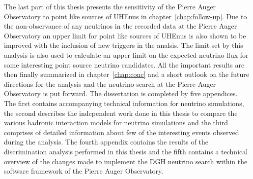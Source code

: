 The last part of this thesis presents the sensitivity of the Pierre Auger Observatory to point like sources of \glspl{UHEnu} in chapter~\ref{chap:follow-up}. Due to the non-observance of any neutrinos in the recorded data at the Pierre Auger Observatory an upper limit for point like sources of \glspl{UHEnu} is also shown to be improved with the inclusion of new triggers in the analsis. The limit set by this analysis is also used to calculate an upper limit on the expected neutrino flux for some interesting point source neutrino candidates. All the important results are then finally summarized in chapter~\ref{chap:conc} and a short outlook on the future directions for the analysis and the neutrino search at the Pierre Auger Observatory is put forward. The dissertation is completed by five appendices. The first contains accompanying technical information for neutrino simulations, the second describes the independent work done in this thesis to compare the various hadronic interaction models for neutrino simulations and the third comprises of detailed information about few of the interesting events observed during the analysis. The fourth appendix contains the results of the discrimination analysis performed in this thesis and the fifth contains a technical overview of the changes made to implement the \gls{DGH} neutrino search within the software framework of the Pierre Auger Observatory. 

